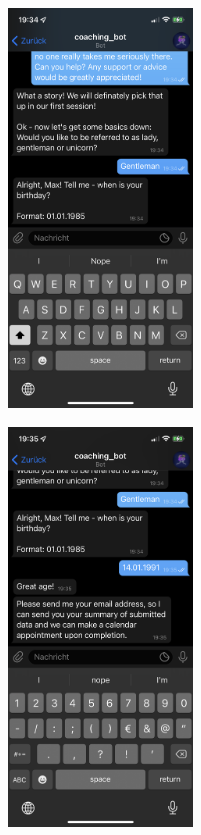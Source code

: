 	\begin{figure}
		\centering
		\begin{minipage}{.48\linewidth}
			\centering
			{\includegraphics[width=\linewidth,height=300pt,keepaspectratio]{images/Screenshots/birthdate.PNG}}
		
			{\includegraphics[width=\linewidth,height=300pt,keepaspectratio]{images/Screenshots/email.PNG}}
		

\end{minipage}
\end{figure}
